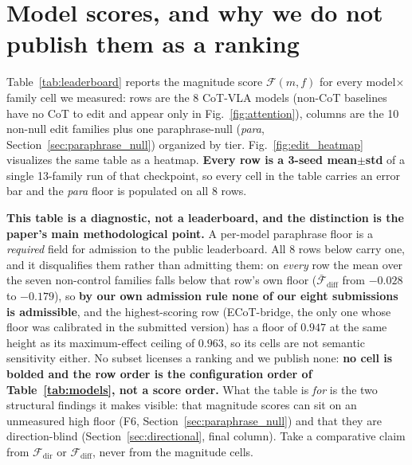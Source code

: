 \documentclass{article}
\begin{document}
\section{Model scores, and why we do not publish them as a ranking}
\label{sec:results}

Table~\ref{tab:leaderboard} reports the magnitude score $\mathcal{F}(m, f)$ for every model$\times$family cell we measured: rows are the 8 CoT-VLA models (non-CoT baselines have no CoT to edit and appear only in Fig.~\ref{fig:attention}), columns are the 10 non-null edit families plus one paraphrase-null (\emph{para}, Section~\ref{sec:paraphrase_null}) organized by tier. Fig.~\ref{fig:edit_heatmap} visualizes the same table as a heatmap. \textbf{Every row is a 3-seed mean$\pm$std} of a single 13-family run of that checkpoint, so every cell in the table carries an error bar and the \emph{para} floor is populated on all 8 rows.

\textbf{This table is a diagnostic, not a leaderboard, and the distinction is the paper's main methodological point.} A per-model paraphrase floor is a \emph{required} field for admission to the public leaderboard. All 8 rows below carry one, and it disqualifies them rather than admitting them: on \emph{every} row the mean over the seven non-control families falls below that row's own floor ($\bar{\mathcal{F}}_{\text{diff}}$ from $-0.028$ to $-0.179$), so \textbf{by our own admission rule none of our eight submissions is admissible}, and the highest-scoring row (ECoT-bridge, the only one whose floor was calibrated in the submitted version) has a floor of $0.947$ at the same height as its maximum-effect ceiling of $0.963$, so its cells are not semantic sensitivity either. No subset licenses a ranking and we publish none: \textbf{no cell is bolded and the row order is the configuration order of Table~\ref{tab:models}, not a score order.} What the table is \emph{for} is the two structural findings it makes visible: that magnitude scores can sit on an unmeasured high floor (F6, Section~\ref{sec:paraphrase_null}) and that they are direction-blind (Section~\ref{sec:directional}, final column). Take a comparative claim from $\mathcal{F}_{\text{dir}}$ or $\mathcal{F}_{\text{diff}}$, never from the magnitude cells.
\end{document}
